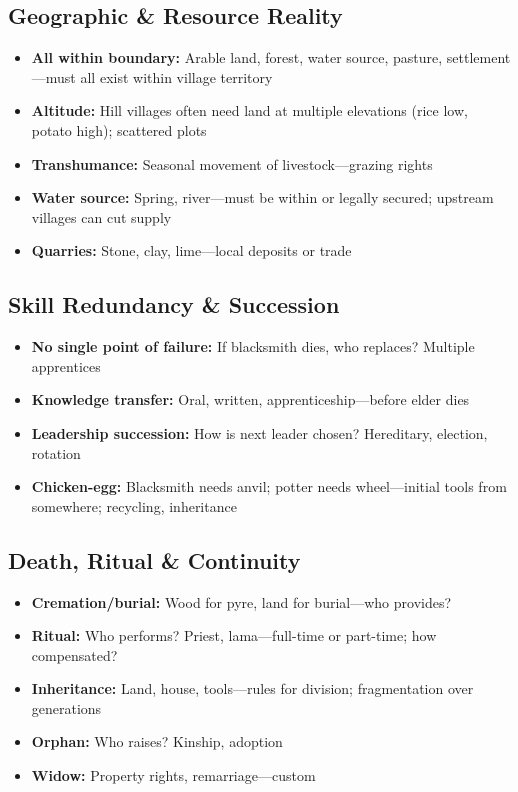 \documentclass[11pt,a4paper]{article}
\begin{document}
\subsection{Geographic \& Resource Reality}
\begin{itemize}
    \item \textbf{All within boundary:} Arable land, forest, water source, pasture, settlement---must all exist within village territory
    \item \textbf{Altitude:} Hill villages often need land at multiple elevations (rice low, potato high); scattered plots
    \item \textbf{Transhumance:} Seasonal movement of livestock---grazing rights
    \item \textbf{Water source:} Spring, river---must be within or legally secured; upstream villages can cut supply
    \item \textbf{Quarries:} Stone, clay, lime---local deposits or trade
\end{itemize}

\subsection{Skill Redundancy \& Succession}
\begin{itemize}
    \item \textbf{No single point of failure:} If blacksmith dies, who replaces? Multiple apprentices
    \item \textbf{Knowledge transfer:} Oral, written, apprenticeship---before elder dies
    \item \textbf{Leadership succession:} How is next leader chosen? Hereditary, election, rotation
    \item \textbf{Chicken-egg:} Blacksmith needs anvil; potter needs wheel---initial tools from somewhere; recycling, inheritance
\end{itemize}

\subsection{Death, Ritual \& Continuity}
\begin{itemize}
    \item \textbf{Cremation/burial:} Wood for pyre, land for burial---who provides?
    \item \textbf{Ritual:} Who performs? Priest, lama---full-time or part-time; how compensated?
    \item \textbf{Inheritance:} Land, house, tools---rules for division; fragmentation over generations
    \item \textbf{Orphan:} Who raises? Kinship, adoption
    \item \textbf{Widow:} Property rights, remarriage---custom
\end{itemize}
\end{document}
